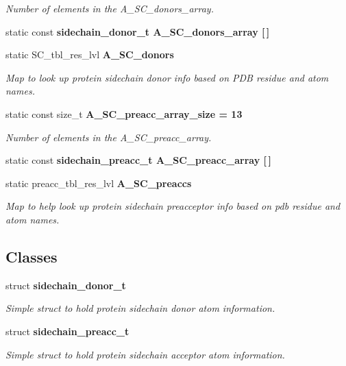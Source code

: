 \begin{CompactItemize}
\begin{CompactList}\small\item\em Number of elements in the A\_\-SC\_\-donors\_\-array. \item\end{CompactList}\item 
static const \bf{sidechain\_\-donor\_\-t} \textbf{A\_\-SC\_\-donors\_\-array} [$\,$]
\item 
static SC\_\-tbl\_\-res\_\-lvl \bf{A\_\-SC\_\-donors}\label{classSimSite3D_1_1HbondGeometry_41f1ae04adc06ecce1090fc0b29bdb6c}

\begin{CompactList}\small\item\em Map to look up protein sidechain donor info based on PDB residue and atom names. \item\end{CompactList}\item 
static const size\_\-t \bf{A\_\-SC\_\-preacc\_\-array\_\-size} = 13\label{classSimSite3D_1_1HbondGeometry_db54f5c38c13a2ba3a4e28b41ba8024c}

\begin{CompactList}\small\item\em Number of elements in the A\_\-SC\_\-preacc\_\-array. \item\end{CompactList}\item 
static const \bf{sidechain\_\-preacc\_\-t} \textbf{A\_\-SC\_\-preacc\_\-array} [$\,$]
\item 
static preacc\_\-tbl\_\-res\_\-lvl \bf{A\_\-SC\_\-preaccs}\label{classSimSite3D_1_1HbondGeometry_0707a6e39cd01a720da5469cc0138af4}

\begin{CompactList}\small\item\em Map to help look up protein sidechain preacceptor info based on pdb residue and atom names. \item\end{CompactList}\end{CompactItemize}
\subsection*{Classes}
\begin{CompactItemize}
\item 
struct \bf{sidechain\_\-donor\_\-t}
\begin{CompactList}\small\item\em Simple struct to hold protein sidechain donor atom information. \item\end{CompactList}\item 
struct \bf{sidechain\_\-preacc\_\-t}
\begin{CompactList}\small\item\em Simple struct to hold protein sidechain acceptor atom information. \item\end{CompactList}\end{CompactItemize}


